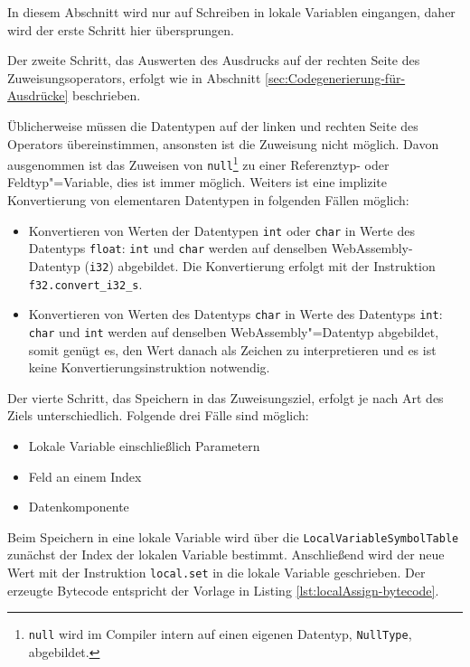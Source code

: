 In diesem Abschnitt wird nur auf Schreiben in lokale Variablen eingangen, daher wird der erste Schritt hier übersprungen.

Der zweite Schritt, das Auswerten des Ausdrucks auf der rechten Seite des Zuweisungsoperators, erfolgt wie in Abschnitt \ref{sec:Codegenerierung-für-Ausdrücke} beschrieben.

Üblicherweise müssen die Datentypen auf der linken und rechten Seite des Operators übereinstimmen, ansonsten ist die Zuweisung nicht möglich. Davon ausgenommen ist das Zuweisen von \lstinline{null}\footnote{\lstinline{null} wird im Compiler intern auf einen eigenen Datentyp, \lstinline{NullType}, abgebildet.} zu einer Referenztyp- oder Feldtyp"=Variable, dies ist immer möglich. Weiters ist eine implizite Konvertierung von elementaren Datentypen in folgenden Fällen möglich:
\begin{itemize}
    \item Konvertieren von Werten der Datentypen \lstinline{int} oder \lstinline{char} in Werte des Datentyps \lstinline{float}: \lstinline{int} und \lstinline{char} werden auf denselben WebAssembly-Datentyp (\lstinline{i32}) abgebildet. Die Konvertierung erfolgt mit der Instruktion \lstinline{f32.convert_i32_s}.
    \item Konvertieren von Werten des Datentyps \lstinline{char} in Werte des Datentyps \lstinline{int}: \lstinline{char} und \lstinline{int} werden auf denselben WebAssembly"=Datentyp abgebildet, somit genügt es, den Wert danach als Zeichen zu interpretieren und es ist keine Konvertierungsinstruktion notwendig.
\end{itemize}

Der vierte Schritt, das Speichern in das Zuweisungsziel, erfolgt je nach Art des Ziels unterschiedlich. Folgende drei Fälle sind möglich:
\begin{itemize}
    \item Lokale Variable einschließlich Parametern
    \item Feld an einem Index
    \item Datenkomponente
\end{itemize}

Beim Speichern in eine lokale Variable wird über die \lstinline{LocalVariableSymbolTable} zunächst der Index der lokalen Variable bestimmt. Anschließend wird der neue Wert mit der Instruktion \lstinline{local.set} in die lokale Variable geschrieben. Der erzeugte Bytecode entspricht der Vorlage in Listing \ref{lst:localAssign-bytecode}.

